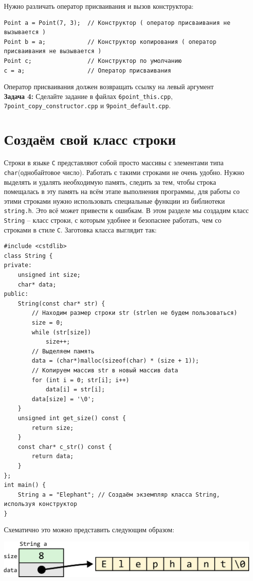 \documentclass{article}
\begin{document}
Нужно различать оператор присваивания и вызов конструктора:
\begin{lstlisting}
Point a = Point(7, 3);  // Конструктор ( оператор присваивания не вызывается )
Point b = a;            // Конструктор копирования ( оператор присваивания не вызывается )
Point c;                // Конструктор по умолчанию
c = a;                  // Оператор присваивания
\end{lstlisting}
Оператор присваивания должен возвращать ссылку на левый аргумент\\
\textbf{Задача 4:} Сделайте задание в файлах \texttt{6point\_this.cpp}, \texttt{7point\_copy\_constructor.cpp} и \texttt{9point\_default.cpp}.

\newpage
\section*{Создаём свой класс строки}
Строки в языке \texttt{C} представляют собой просто массивы с элементами типа \texttt{char}(однобайтовое число). Работать с такими строками не очень удобно. Нужно выделять и удалять необходимую память, следить за тем, чтобы строка помещалась в эту память на всём этапе выполнения программы, для работы со этими строками нужно использовать специальные функции из библиотеки \texttt{string.h}. Это всё может привести к ошибкам. В этом разделе мы создадим класс \texttt{String} -- класс строки, с которым удобнее и безопаснее работать, чем со строками в стиле \texttt{C}. Заготовка класса выглядит так:
\begin{lstlisting}
#include <cstdlib>
class String {
private:
	unsigned int size;
	char* data;
public:
	String(const char* str) {
		// Находим размер строки str (strlen не будем пользоваться)
		size = 0;
		while (str[size])
			size++;
		// Выделяем память
		data = (char*)malloc(sizeof(char) * (size + 1));
		// Копируем массив str в новый массив data
		for (int i = 0; str[i]; i++)
			data[i] = str[i];
		data[size] = '\0';
	}
	unsigned int get_size() const {
		return size;
	}
	const char* c_str() const {
		return data;
	}
};
int main() {
	String a = "Elephant"; // Создаём экземпляр класса String, используя конструктор
}
\end{lstlisting}

Схематично это можно представить следующим образом:
\begin{center}
\includegraphics[scale=0.86]{../images/string_base.png}
\end{center}
\end{document}
